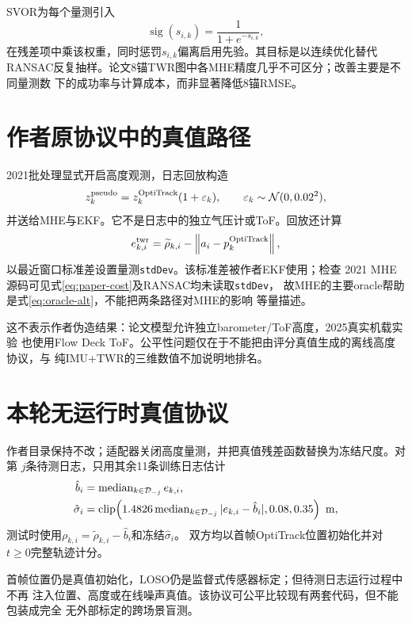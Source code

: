 \documentclass[11pt,a4paper]{ctexart}
\newcommand{\norm}[1]{\left\lVert #1\right\rVert}
\newcommand{\med}{\operatorname{median}}
\begin{document}
SVOR为每个量测引入
\begin{equation}
\operatorname{sig}(s_{i,k})=\frac{1}{1+e^{-s_{i,k}}},
\end{equation}
在残差项中乘该权重，同时惩罚$s_{i,k}$偏离启用先验。其目标是以连续优化替代
RANSAC反复抽样。论文8锚TWR图中各MHE精度几乎不可区分；改善主要是不同量测数
下的成功率与计算成本，而非显著降低8锚RMSE。

\section{作者原协议中的真值路径}

2021批处理显式开启高度观测，日志回放构造
\begin{equation}
z_k^{\rm pseudo}=z_k^{\rm OptiTrack}(1+\varepsilon_k),
\qquad\varepsilon_k\sim\mathcal N(0,0.02^2),
\label{eq:oracle-alt}
\end{equation}
并送给MHE与EKF。它不是日志中的独立气压计或ToF。回放还计算
\begin{equation}
e_{k,i}^{\rm twr}=\widetilde\rho_{k,i}
-\norm{a_i-p_k^{\rm OptiTrack}},
\label{eq:oracle-range}
\end{equation}
以最近窗口标准差设置量测\texttt{stdDev}。该标准差被作者EKF使用；检查
2021 MHE源码可见式\eqref{eq:paper-cost}及RANSAC均未读取\texttt{stdDev}，
故MHE的主要oracle帮助是式\eqref{eq:oracle-alt}，不能把两条路径对MHE的影响
等量描述。

这不表示作者伪造结果：论文模型允许独立barometer/ToF高度，2025真实机载实验
也使用Flow Deck ToF。公平性问题仅在于不能把由评分真值生成的离线高度协议，与
纯IMU+TWR的三维数值不加说明地排名。

\section{本轮无运行时真值协议}

作者目录保持不改；适配器关闭高度量测，并把真值残差函数替换为冻结尺度。对第
$j$条待测日志，只用其余11条训练日志估计
\begin{align}
\hat b_i&=\med_{k\in\mathcal D_{-j}}e_{k,i},\\
\hat\sigma_i&=\operatorname{clip}\!\left(
1.4826\med_{k\in\mathcal D_{-j}}|e_{k,i}-\hat b_i|,
0.08,0.35\right)\ {\rm m},
\label{eq:loso}
\end{align}
测试时使用$\rho_{k,i}=\widetilde\rho_{k,i}-\hat b_i$和冻结$\hat\sigma_i$。
双方均以首帧OptiTrack位置初始化并对$t\ge0$完整轨迹计分。

首帧位置仍是真值初始化，LOSO仍是监督式传感器标定；但待测日志运行过程中不再
注入位置、高度或在线噪声真值。该协议可公平比较现有两套代码，但不能包装成完全
无外部标定的跨场景盲测。
\end{document}
